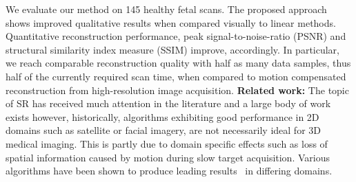 \documentclass[runningheads,a4paper]{llncs}
\newcommand{\todo}[1]{}
\renewcommand{\todo}[1]{{\color{red} TODO: {#1}}}
\begin{document}
We evaluate our method on 145 healthy fetal scans. The proposed approach shows improved qualitative results when compared visually to linear methods. Quantitative reconstruction performance, peak signal-to-noise-ratio (PSNR) and structural similarity index measure (SSIM) improve, accordingly. In particular, we reach comparable reconstruction quality with half as many data samples, thus half of the currently required scan time, when compared to motion compensated reconstruction from high-resolution image acquisition.
\newline
\newline
\noindent \textbf{Related work:}
\label{sec:rel_work}
%
The topic of SR has received much attention in the literature and a large body of work exists however, historically, algorithms exhibiting good performance in 2D domains such as satellite or facial imagery, are not necessarily ideal for 3D medical imaging. This is partly due to domain specific effects such as loss of spatial information caused by motion during slow target acquisition. Various algorithms have been shown to produce leading results~\cite{Nasrollahi2014} in differing domains. %
\end{document}
